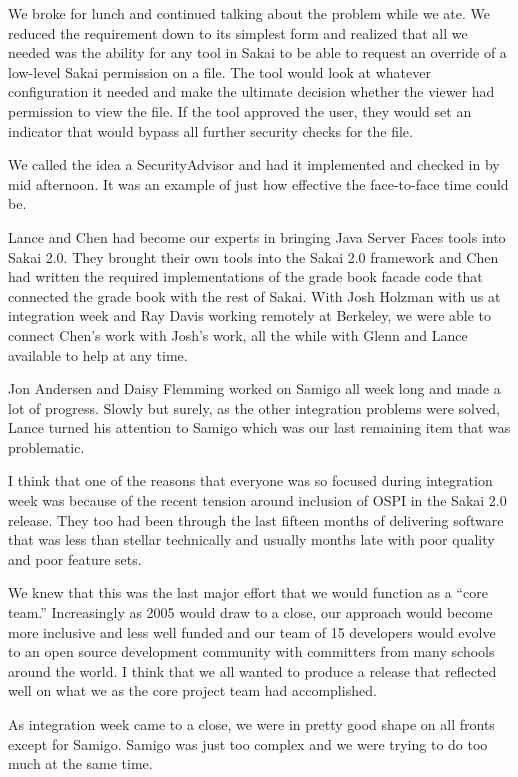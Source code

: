 \documentclass[12pt]{book}
\begin{document}
We broke for lunch and continued talking about the problem
while we ate.  We reduced the requirement down to its simplest
form and realized that all we needed was the ability for any
tool in Sakai to be able to request an override
of a low-level Sakai permission on a file.  The tool would
look at whatever configuration it needed and make the
ultimate decision whether the viewer had permission to view
the file.   If the tool approved the user, they would set
an indicator that would bypass all further security checks
for the file.

We called the idea a SecurityAdvisor and had it
implemented and checked in by mid afternoon.  It was an
example of just how effective the face-to-face time could be.

Lance and Chen had become our experts in bringing Java
Server Faces tools into Sakai 2.0.   They brought their own tools
into the Sakai 2.0 framework and Chen had written the
required implementations of the grade book facade code that
connected the grade book with the rest of Sakai.
With Josh Holzman with us at integration week and Ray Davis
working remotely at Berkeley, we were able to connect
Chen's work with Josh's work, all the while with Glenn
and Lance available to help at any time.

Jon Andersen and Daisy Flemming worked on Samigo all week
long and made a lot of progress.  Slowly but surely, as the
other integration problems were solved, Lance turned his
attention to Samigo which was our last remaining item that
was problematic.

I think that one of the reasons that everyone was so
focused during integration week was because of
the recent tension around inclusion of OSPI in the
Sakai 2.0 release.
They too had been through the last fifteen months of
delivering software that was less than stellar technically
and usually months late with poor quality and poor feature
sets.

We knew that this was the last major effort that we would
function as a ``core team.''   Increasingly as 2005 would draw
to a close, our approach would become more inclusive and
less well funded and our team of 15 developers would evolve
to an open source development community with committers
from many schools around the world.  I think that we all
wanted to produce a release that reflected well on what we
as the core project team had accomplished.

As integration week came to a close, we were in pretty
good shape on all fronts except for Samigo.  Samigo was
just too complex and we were trying to do too much at the
same time.
\end{document}
